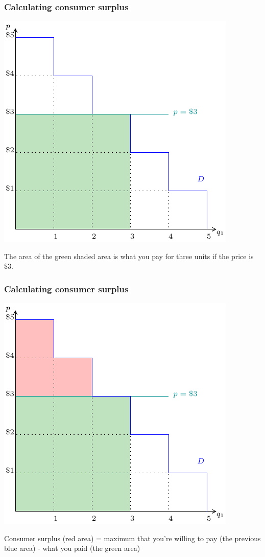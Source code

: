 \documentclass[xcolor=pdftex,dvipsnames]{beamer}
\begin{document}
\begin{frame}
\frametitle{Calculating consumer surplus}
\begin{center}
\includegraphics[scale=0.9]{pics/ConsumerWelfare5}
\end{center}
The area of the green shaded area is what you pay for three units if
the price is \$3.

\end{frame}



\begin{frame}
\frametitle{Calculating consumer surplus}
\begin{center}
\includegraphics[scale=0.9]{pics/ConsumerWelfare6}
\end{center}
Consumer surplus (red area) = maximum that
you're willing to pay (the previous blue area) - what you paid (the
green area)
\end{frame}
\end{document}
